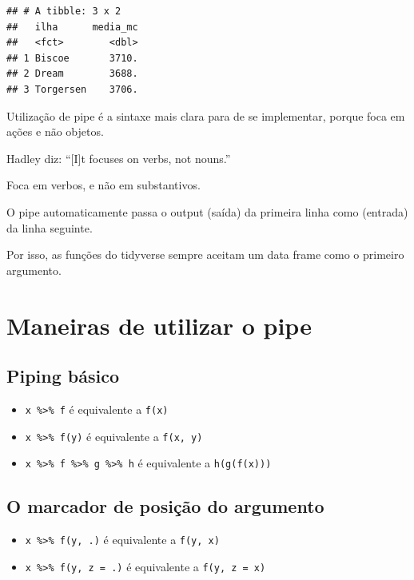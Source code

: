 \documentclass[
]{book}
\providecommand{\tightlist}{%
  \setlength{\itemsep}{0pt}\setlength{\parskip}{0pt}}
\begin{document}
\begin{verbatim}
## # A tibble: 3 x 2
##   ilha      media_mc
##   <fct>        <dbl>
## 1 Biscoe       3710.
## 2 Dream        3688.
## 3 Torgersen    3706.
\end{verbatim}

Utilização de pipe é a sintaxe mais clara para de se implementar, porque foca em ações e não objetos.

Hadley diz: ``{[}I{]}t focuses on verbs, not nouns.''

Foca em verbos, e não em substantivos.

O pipe automaticamente passa o output (saída) da primeira linha como (entrada) da linha seguinte.

Por isso, as funções do tidyverse sempre aceitam um data frame como o primeiro argumento.

\hypertarget{maneiras-de-utilizar-o-pipe}{%
\section{Maneiras de utilizar o pipe}\label{maneiras-de-utilizar-o-pipe}}

\hypertarget{piping-buxe1sico}{%
\subsection{Piping básico}\label{piping-buxe1sico}}

\begin{itemize}
\tightlist
\item
  \texttt{x\ \%\textgreater{}\%\ f} é equivalente a \texttt{f(x)}
\item
  \texttt{x\ \%\textgreater{}\%\ f(y)} é equivalente a \texttt{f(x,\ y)}
\item
  \texttt{x\ \%\textgreater{}\%\ f\ \%\textgreater{}\%\ g\ \%\textgreater{}\%\ h} é equivalente a \texttt{h(g(f(x)))}
\end{itemize}

\hypertarget{o-marcador-de-posiuxe7uxe3o-do-argumento}{%
\subsection{O marcador de posição do argumento}\label{o-marcador-de-posiuxe7uxe3o-do-argumento}}

\begin{itemize}
\tightlist
\item
  \texttt{x\ \%\textgreater{}\%\ f(y,\ .)} é equivalente a \texttt{f(y,\ x)}
\item
  \texttt{x\ \%\textgreater{}\%\ f(y,\ z\ =\ .)} é equivalente a \texttt{f(y,\ z\ =\ x)}
\end{itemize}
\end{document}
